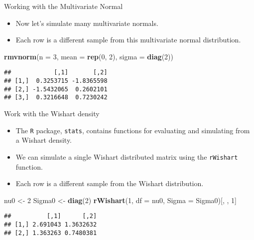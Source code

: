 \documentclass[ignorenonframetext,]{beamer}
\newenvironment{Shaded}{\begin{snugshade}}{\end{snugshade}}
\newcommand{\KeywordTok}[1]{\textcolor[rgb]{0.13,0.29,0.53}{\textbf{#1}}}
\newcommand{\DataTypeTok}[1]{\textcolor[rgb]{0.13,0.29,0.53}{#1}}
\newcommand{\DecValTok}[1]{\textcolor[rgb]{0.00,0.00,0.81}{#1}}
\newcommand{\StringTok}[1]{\textcolor[rgb]{0.31,0.60,0.02}{#1}}
\newcommand{\NormalTok}[1]{#1}
\providecommand{\tightlist}{%
  \setlength{\itemsep}{0pt}\setlength{\parskip}{0pt}}
\begin{document}
\begin{frame}[fragile]{Working with the Multivariate Normal}

\begin{itemize}
\tightlist
\item
  Now let's simulate many multivariate normals.
\item
  Each row is a different sample from this multivariate normal
  distribution.
\end{itemize}

\begin{Shaded}
\begin{Highlighting}[]
\KeywordTok{rmvnorm}\NormalTok{(}\DataTypeTok{n =} \DecValTok{3}\NormalTok{, }\DataTypeTok{mean =} \KeywordTok{rep}\NormalTok{(}\DecValTok{0}\NormalTok{, }\DecValTok{2}\NormalTok{), }\DataTypeTok{sigma =} \KeywordTok{diag}\NormalTok{(}\DecValTok{2}\NormalTok{))}
\end{Highlighting}
\end{Shaded}

\begin{verbatim}
##            [,1]       [,2]
## [1,]  0.3253715 -1.8365598
## [2,] -1.5432065  0.2602101
## [3,]  0.3216648  0.7230242
\end{verbatim}

\end{frame}

\begin{frame}[fragile]{Work with the Wishart density}

\begin{itemize}
\item
  The \texttt{R} package, \texttt{stats}, contains functions for
  evaluating and simulating from a Wishart density.
\item
  We can simulate a single Wishart distributed matrix using the
  \texttt{rWishart} function.
\item
  Each row is a different sample from the Wishart distribution.
\end{itemize}

\begin{Shaded}
\begin{Highlighting}[]
\NormalTok{nu0 <-}\StringTok{ }\DecValTok{2}
\NormalTok{Sigma0 <-}\StringTok{ }\KeywordTok{diag}\NormalTok{(}\DecValTok{2}\NormalTok{)}
\KeywordTok{rWishart}\NormalTok{(}\DecValTok{1}\NormalTok{, }\DataTypeTok{df =}\NormalTok{ nu0, }\DataTypeTok{Sigma =}\NormalTok{ Sigma0)[, , }\DecValTok{1}\NormalTok{]}
\end{Highlighting}
\end{Shaded}

\begin{verbatim}
##          [,1]      [,2]
## [1,] 2.691043 1.3632632
## [2,] 1.363263 0.7480381
\end{verbatim}

\end{frame}
\end{document}
